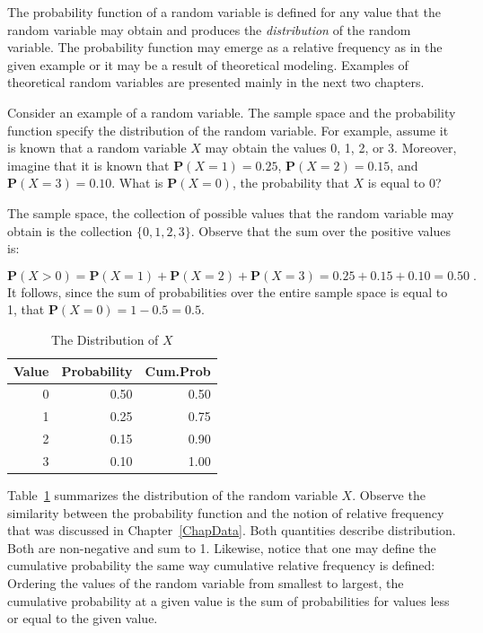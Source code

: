 \documentclass[]{krantz}
\newcommand{\Prob}{\mathbf{P}}
\theoremstyle{definition}
\theoremstyle{definition}
\theoremstyle{definition}
\theoremstyle{remark}
\begin{document}
The probability function of a random variable is defined for any value
that the random variable may obtain and produces the \emph{distribution} of
the random variable. The probability function may emerge as a relative
frequency as in the given example or it may be a result of theoretical
modeling. Examples of theoretical random variables are presented mainly
in the next two chapters.

Consider an example of a random variable. The sample space and the
probability function specify the distribution of the random variable.
For example, assume it is known that a random variable \(X\) may obtain
the values 0, 1, 2, or 3. Moreover, imagine that it is known that
\(\Prob(X=1) = 0.25\), \(\Prob(X=2) = 0.15\), and \(\Prob(X=3)= 0.10\). What
is \(\Prob(X=0)\), the probability that \(X\) is equal to 0?

The sample space, the collection of possible values that the random
variable may obtain is the collection \(\{0,1,2,3\}\). Observe that the
sum over the positive values is:

\[\Prob(X > 0) = \Prob(X=1) + \Prob(X=2) + \Prob(X=3) = 0.25 + 0.15 + 0.10 = 0.50\;.\]
It follows, since the sum of probabilities over the entire sample space
is equal to 1, that \(\Prob(X=0) = 1- 0.5 = 0.5\).

\begin{table}[t]

\caption{\label{tab:Probability1}The Distribution of $X$}
\centering
\begin{tabular}{rrr}
\toprule
Value & Probability & Cum.Prob\\
\midrule
0 & 0.50 & 0.50\\
1 & 0.25 & 0.75\\
2 & 0.15 & 0.90\\
3 & 0.10 & 1.00\\
\bottomrule
\end{tabular}
\end{table}

Table~\ref{tab:Probability1} summarizes the distribution of the random
variable \(X\). Observe the similarity between the probability function
and the notion of relative frequency that was discussed in
Chapter~\ref{ChapData}. Both quantities describe distribution. Both are
non-negative and sum to 1. Likewise, notice that one may define the
cumulative probability the same way cumulative relative frequency is
defined: Ordering the values of the random variable from smallest to
largest, the cumulative probability at a given value is the sum of
probabilities for values less or equal to the given value.
\end{document}
